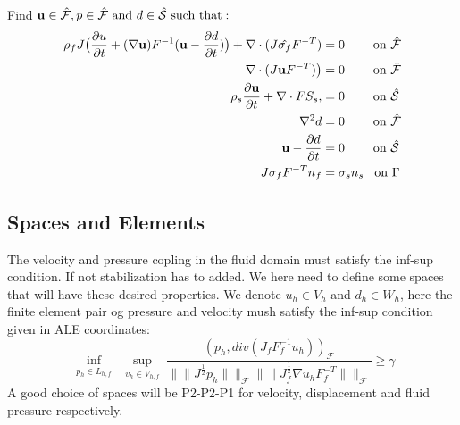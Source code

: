 Find $\bold{u} \in \hat{\mathcal{F}} , p \in \hat{\mathcal{F}} \text{  and  } d \in \hat{\mathcal{S}} \text{  such that}:$ 
\begin{align}
\rho_f J \big( \frac{\partial u}{\partial t} + (\nabla \bold{u} )F^{-1}(\bold{u} -\frac{\partial d}{\partial t})\big)  + \nabla \cdot( J \hat{\sigma_f} F^{-T})  &= 0 \hspace{8mm}\text{on  } \hat{\mathcal{F}} \\
\nabla \cdot (J \bold{u}  F^{-T})\big) &= 0 \hspace{8mm} \text{on  } \hat{\mathcal{F}}   \\
\rho_s \frac{\partial \bold{u} }{\partial t} + \nabla \cdot F S_s,&=0 \hspace{8mm} \text{on  } \hat{\mathcal{S}}\\
\nabla^2 d &= 0 \hspace{8mm} \text{on  } \hat{\mathcal{F}}\\
\bold{u} - \frac{\partial d}{\partial t}  &= 0 \hspace{8mm} \text{on  } \hat{\mathcal{S}}\\
J\sigma_f F^{-T} n_f &= \sigma_s  n_s \hspace{3mm} \text{on  } \Gamma
\end{align}



\subsection{Spaces and Elements}
The velocity and pressure copling in the fluid domain must satisfy the inf-sup condition. If not stabilization has to added. We here need to define some spaces that will have these desired properties.
We denote $u_h \in V_h$ and $ d_h \in W_h $, here the finite element pair og pressure and velocity mush satisfy the inf-sup condition given in ALE coordinates:
$$   \inf_{\substack{p_h \in L_{h,f}}}  \sup_{\substack{v_h \in V_{h,f}}} \frac{ (p_h, div(J_f F_f^{-1} u_h))_{\mathcal{F}} }{ \|\|J^{\frac{1}{2}} p_h  \|\|_{\mathcal{F}} \|\|  J^{\frac{1}{2}}_{f} \nabla u_h F_f^{-T} \|\|_{\mathcal{F}}  } \geq \gamma     $$
A good choice of spaces will be P2-P2-P1 for velocity, displacement and fluid pressure respectively. 








